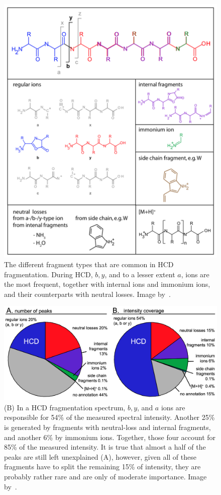 \begin{figure}
  \centering
  \includegraphics[width=.9\linewidth]{img/fragment-types-hcd.png}
  \caption{The different fragment types that are common in HCD fragmentation. During HCD, \(b, y\), and to a lesser extent \(a\), ions are the most frequent, together with internal ions and immonium ions, and their counterparts with neutral losses. Image by~\citet{michalski2012systematic}.}\label{fig:fragment-types-hcd}
\end{figure}

\begin{figure}
  \centering
  \includegraphics[width=.9\linewidth]{img/hcd.png}
  \caption{(B) In a HCD fragmentation spectrum, \(b, y\), and \(a\) ions are responsible for 54\% of the measured spectral intensity. Another 25\% is generated by fragments with neutral-loss and internal fragments, and another 6\% by immonium ions. Together, those four account for 85\% of the measured intensity. It is true that almost a half of the peaks are still left unexplained (A), however, given all of these fragments have to split the remaining 15\% of intensity, they are probably rather rare and are only of moderate importance. Image by~\citet{michalski2012systematic}.}\label{fig:hcd}
\end{figure}

